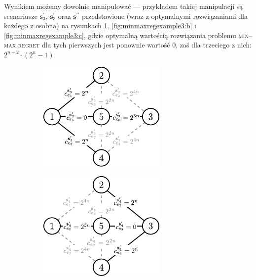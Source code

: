 Wynikiem możemy dowolnie manipulować --- przykładem takiej manipulacji są scenariusze $\textbf{s}^{\prime}_{3}$, $\textbf{s}^{\prime}_{3}$ oraz $\textbf{s}^{\prime\prime}$ przedstawione (wraz z optymalnymi rozwiązaniami dla każdego z osobna) na rysunkach \ref{fig:minmaxregexample3:a}, \ref{fig:minmaxregexample3:b} i \ref{fig:minmaxregexample3:c}, gdzie optymalną wartością rozwiązania problemu \textsc{min--max regret} dla tych pierwszych jest ponownie wartość $0$, zaś dla trzeciego z nich: $2^{n+2} \cdot \left( 2^{n} - 1\right)$.

\begin{figure}[!htbp]
	\null\hfill
	\begin{subfigure}[b]{0.3\textwidth}
		\includegraphics[width=\textwidth]{Chapter_II/MIN-MAX-REG3-example/a}
		\caption{}
		\label{fig:minmaxregexample3:a}
	\end{subfigure}
	\hfill
	\begin{subfigure}[b]{0.3\textwidth}
		\includegraphics[width=\textwidth]{Chapter_II/MIN-MAX-REG3-example/b}

\end{subfigure}
\end{figure}

